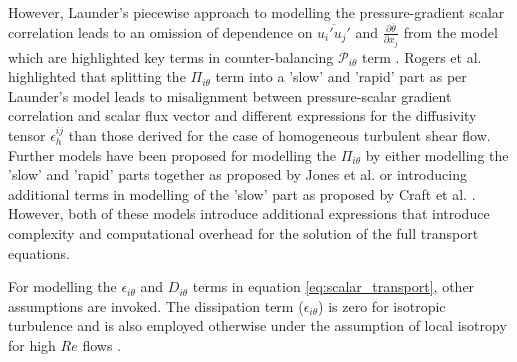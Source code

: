 However, Launder's piecewise approach to modelling the pressure-gradient scalar correlation leads to an omission of dependence on $\overline{u_{i}'u_{j}'}$ and $\frac{\partial \overline{\theta}}{\partial x_{j}}$ from the model which are highlighted key terms in counter-balancing $\mathcal{P}_{i\theta}$ term \cite{Younis2005}. Rogers et al. \cite{Rogers1989} highlighted that splitting the $\Pi_{i\theta}$ term into a 'slow' and 'rapid' part as per Launder's model leads to misalignment between pressure-scalar gradient correlation and scalar flux vector and different expressions for the diffusivity tensor $\epsilon_{h}^{ij}$ than those derived for the case of homogeneous turbulent shear flow. Further models have been proposed for modelling the $\Pi_{i\theta}$ by either modelling the 'slow' and 'rapid' parts together as proposed by Jones et al. \cite{Jones1988} or introducing additional terms in modelling of the 'slow' part as proposed by Craft et al. \cite{Craft1989}. However, both of these models introduce additional expressions that introduce complexity and computational overhead for the solution of the full transport equations. 

For modelling the $\epsilon_{i\theta}$ and $D_{i\theta}$ terms in equation \ref{eq:scalar_transport}, other assumptions are invoked. The dissipation term ($\epsilon_{i\theta}$) is zero for isotropic turbulence and is also employed otherwise under the assumption of local isotropy for high $Re$ flows \cite{Younis2005} \cite{Wikstrom1998} \cite{Combest2011}. 